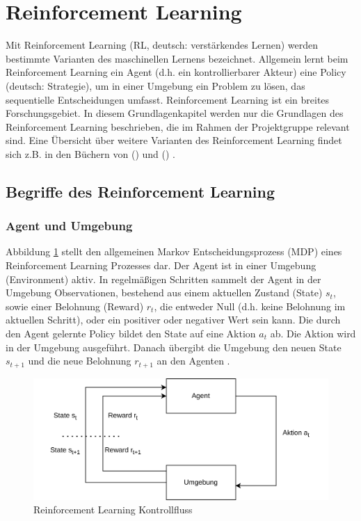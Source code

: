 \section{Reinforcement Learning}
Mit Reinforcement Learning (RL, deutsch: verstärkendes Lernen) werden bestimmte Varianten des maschinellen Lernens bezeichnet. Allgemein lernt beim Reinforcement Learning ein Agent (d.h. ein kontrollierbarer Akteur) eine Policy (deutsch: Strategie), um in einer Umgebung ein Problem zu lösen, das sequentielle Entscheidungen umfasst. Reinforcement Learning ist ein breites Forschungsgebiet. In diesem Grundlagenkapitel werden nur die Grundlagen des Reinforcement Learning beschrieben, die im Rahmen der Projektgruppe relevant sind. Eine Übersicht über weitere Varianten des Reinforcement Learning findet sich z.B. in den Büchern von \citeauthor{FoundationsDeepRL} (\citeyear{FoundationsDeepRL}) und \citeauthor{deepRL-2020} (\citeyear{deepRL-2020}) .

\subsection{Begriffe des Reinforcement Learning}

\subsubsection{Agent und Umgebung}
Abbildung \ref{fig:rl_control_loop} stellt den allgemeinen Markov Entscheidungsprozess (MDP) eines Reinforcement Learning Prozesses dar. Der Agent ist in einer Umgebung (Environment) aktiv. In regelmäßigen Schritten sammelt der Agent in der Umgebung Observationen, bestehend aus einem aktuellen Zustand (State) $s_t$, sowie einer Belohnung (Reward) $r_t$, die entweder Null (d.h. keine Belohnung im aktuellen Schritt), oder ein positiver oder negativer Wert sein kann. Die durch den Agent gelernte Policy bildet den State auf eine Aktion $a_t$ ab. Die Aktion wird in der Umgebung ausgeführt. Danach übergibt die Umgebung den neuen State $s_{t+1}$ und die neue Belohnung $r_{t+1}$ an den Agenten \cite{FoundationsDeepRL}.
\begin{figure}
    \centering
    \includegraphics[width=0.89\linewidth]{resources/img/Reinforcement_Learning/RL_Loop.png}
    \caption{Reinforcement Learning Kontrollfluss \cite{FoundationsDeepRL}}
    \label{fig:rl_control_loop}
\end{figure}

